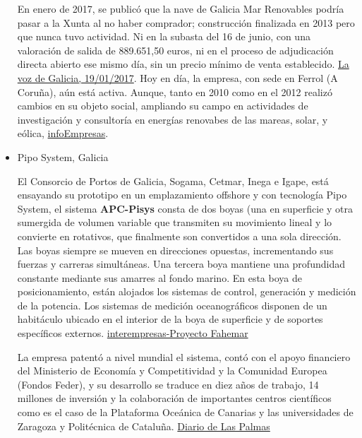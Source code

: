 \begin{itemize}
  En enero de 2017, se publicó que la nave de Galicia Mar Renovables
  podría pasar a la Xunta al no haber comprador; construcción finalizada
  en 2013 pero que nunca tuvo actividad. Ni en la subasta del 16 de
  junio, con una valoración de salida de 889.651,50 euros, ni en el
  proceso de adjudicación directa abierto ese mismo día, sin un precio
  mínimo de venta establecido.
  \href{https://www.lavozdegalicia.es/noticia/ferrol/carino/2017/01/19/nave-galicia-mar-carino-pasar-xunta-haber-comprador/0003_201701F19C7994.htm}{La
  voz de Galicia, 19/01/2017}. Hoy en día, la empresa, con sede en
  Ferrol (A Coruña), aún está activa. Aunque, tanto en 2010 como en el
  2012 realizó cambios en su objeto social, ampliando su campo en
  actividades de investigación y consultoría en energías renovabes de
  las mareas, solar, y eólica,
  \href{https://www.infoempresa.com/es-es/es/empresa/galicia-mar-renovables-sl}{infoEmpresas}.
\item
  Pipo System, Galicia

  El Consorcio de Portos de Galicia, Sogama, Cetmar, Inega e Igape, está
  ensayando su prototipo en un emplazamiento offshore y con tecnología
  Pipo System, el sistema \textbf{APC-Pisys} consta de dos boyas (una en
  superficie y otra sumergida de volumen variable que transmiten su
  movimiento lineal y lo convierte en rotativos, que finalmente son
  convertidos a una sola dirección. Las boyas siempre se mueven en
  direcciones opuestas, incrementando sus fuerzas y carreras
  simultáneas. Una tercera boya mantiene una profundidad constante
  mediante sus amarres al fondo marino. En esta boya de posicionamiento,
  están alojados los sistemas de control, generación y medición de la
  potencia. Los sistemas de medición oceanográficos disponen de un
  habitáculo ubicado en el interior de la boya de superficie y de
  soportes específicos externos.
  \href{http://www.interempresas.net/Energia/Articulos/126331-Generar-energia-a-partir-de-energia-undimotriz.html}{interempresas-Proyecto
  Fahemar}

  La empresa patentó a nivel mundial el sistema, contó con el apoyo
  financiero del Ministerio de Economía y Competitividad y la Comunidad
  Europea (Fondos Feder), y su desarrollo se traduce en diez años de
  trabajo, 14 millones de inversión y la colaboración de importantes
  centros científicos como es el caso de la Plataforma Oceánica de
  Canarias y las universidades de Zaragoza y Politécnica de Cataluña.
  \href{http://www.laprovincia.es/sociedad/2012/10/21/carrera-boya-inteligente/491794.html}{Diario
  de Las Palmas}


\end{itemize}
